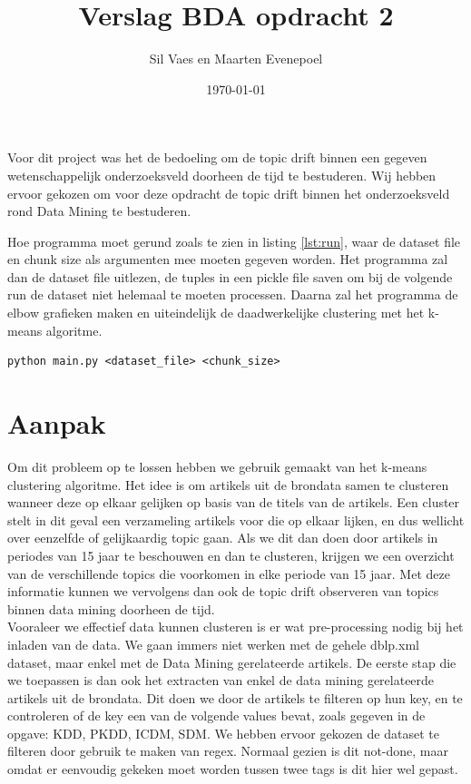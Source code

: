 \documentclass[a4paper,fontsize=11pt]{article}
\author{Sil Vaes en Maarten Evenepoel}
\date{\today}
\title{Verslag BDA opdracht 2}
\begin{document}
\maketitle
\setlength\parindent{0pt}

Voor dit project was het de bedoeling om de topic drift binnen een gegeven wetenschappelijk onderzoeksveld doorheen de tijd te bestuderen. Wij hebben ervoor gekozen om voor deze opdracht de topic drift binnen het onderzoeksveld rond Data Mining te bestuderen.

Hoe programma moet gerund zoals te zien in listing \ref{lst:run}, waar de dataset file en chunk size als argumenten mee moeten gegeven worden.
Het programma zal dan de dataset file uitlezen, de tuples in een pickle file saven om bij de volgende run de dataset niet helemaal te moeten processen.
Daarna zal het programma de elbow grafieken maken en uiteindelijk de daadwerkelijke clustering met het k-means algoritme.

\begin{lstlisting}[caption={KMeans output},label={lst:run},breaklines]
python main.py <dataset_file> <chunk_size>
\end{lstlisting}

\section{Aanpak}

Om dit probleem op te lossen hebben we gebruik gemaakt van het k-means clustering algoritme. Het idee is om artikels uit de brondata samen te clusteren wanneer deze op elkaar gelijken op basis van de titels van de artikels. Een cluster stelt in dit geval een verzameling artikels voor die op elkaar lijken, en dus wellicht over eenzelfde of gelijkaardig topic gaan. Als we dit dan doen door artikels in periodes van 15 jaar te beschouwen en dan te clusteren, krijgen we een overzicht van de verschillende topics die voorkomen in elke periode van 15 jaar. Met deze informatie kunnen we vervolgens dan ook de topic drift observeren van topics binnen data mining doorheen de tijd. \\

Vooraleer we effectief data kunnen clusteren is er wat pre-processing nodig bij het inladen van de data. We gaan immers niet werken met de gehele dblp.xml dataset, maar enkel met de Data Mining gerelateerde artikels. De eerste stap die we toepassen is dan ook het extracten van enkel de data mining gerelateerde artikels uit de brondata. Dit doen we door de artikels te filteren op hun key, en te controleren of de key een van de volgende values bevat, zoals gegeven in de opgave: KDD, PKDD, ICDM, SDM. We hebben ervoor gekozen de dataset te filteren door gebruik te maken van regex. Normaal gezien is dit not-done, maar omdat er eenvoudig gekeken moet worden tussen twee tags is dit hier wel gepast.\\
\end{document}
